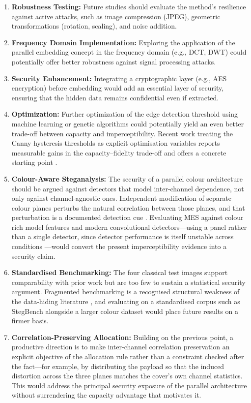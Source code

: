 \begin{enumerate}
    \item \textbf{Robustness Testing:} Future studies should evaluate the method's resilience against active attacks, such as image compression (JPEG), geometric transformations (rotation, scaling), and noise addition.
    \item \textbf{Frequency Domain Implementation:} Exploring the application of the parallel embedding concept in the frequency domain (e.g., DCT, DWT) could potentially offer better robustness against signal processing attacks.
    \item \textbf{Security Enhancement:} Integrating a cryptographic layer (e.g., AES encryption) before embedding would add an essential layer of security, ensuring that the hidden data remains confidential even if extracted.
    \item \textbf{Optimization:} Further optimization of the edge detection threshold using machine learning or genetic algorithms could potentially yield an even better trade-off between capacity and imperceptibility. Recent work treating the Canny hysteresis thresholds as explicit optimisation variables reports measurable gains in the capacity--fidelity trade-off and offers a concrete starting point \citep{singh2026edgeopt}.
    \item \textbf{Colour-Aware Steganalysis:} The security of a parallel colour architecture should be argued against detectors that model inter-channel dependence, not only against channel-agnostic ones. Independent modification of separate colour planes perturbs the natural correlation between those planes, and that perturbation is a documented detection cue \citep{amrutha2023rgbsteganalysis}. Evaluating MES against colour rich model features and modern convolutional detectors---using a panel rather than a single detector, since detector performance is itself unstable across conditions \citep{alrusaini2025robustness}---would convert the present imperceptibility evidence into a security claim.
    \item \textbf{Standardised Benchmarking:} The four classical test images support comparability with prior work but are too few to sustain a statistical security argument. Fragmented benchmarking is a recognised structural weakness of the data-hiding literature \citep{janok2026survey}, and evaluating on a standardised corpus such as StegBench \citep{andone2026stegbench} alongside a larger colour dataset would place future results on a firmer basis.
    \item \textbf{Correlation-Preserving Allocation:} Building on the previous point, a productive direction is to make inter-channel correlation preservation an explicit objective of the allocation rule rather than a constraint checked after the fact---for example, by distributing the payload so that the induced distortion across the three planes matches the cover's own channel statistics. This would address the principal security exposure of the parallel architecture without surrendering the capacity advantage that motivates it.
\end{enumerate}

